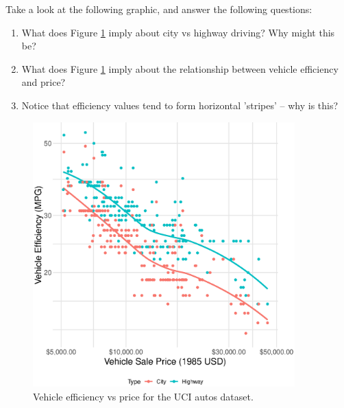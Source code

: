 \documentclass{article}
\begin{document}
Take a look at the following graphic, and answer the following questions:

\begin{enumerate}
\item What does Figure \ref{fig:mpg-vs-usd} imply about city vs highway driving?
  Why might this be?
\item What does Figure \ref{fig:mpg-vs-usd} imply about the relationship between
  vehicle efficiency and price?
\item Notice that efficiency values tend to form horizontal 'stripes' -- why is
  this?
\end{enumerate}

\begin{figure}[!ht]
  \includegraphics[width=0.90\textwidth]{../images/mpg_vs_usd}
  \caption{Vehicle efficiency vs price for the UCI autos dataset.}
  \label{fig:mpg-vs-usd}
\end{figure}
\end{document}
